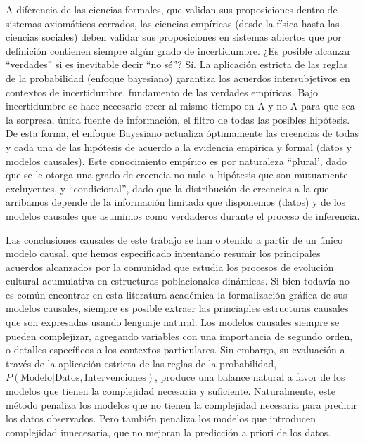 \documentclass[a4paper,11pt]{book}
\theoremstyle{definition}
\begin{document}
A diferencia de las ciencias formales, que validan sus proposiciones dentro de sistemas axiomáticos cerrados, las ciencias empíricas (desde la física hasta las ciencias sociales) deben validar sus proposiciones en sistemas abiertos que por definición contienen siempre algún grado de incertidumbre.
%
¿Es posible alcanzar ``verdades'' si es inevitable decir ``no sé''? Sí.
%
La aplicación estricta de las reglas de la probabilidad (enfoque bayesiano) garantiza los acuerdos intersubjetivos en contextos de incertidumbre, fundamento de las verdades empíricas.
%
 Bajo incertidumbre se hace necesario creer al mismo tiempo en A y no A para que sea la sorpresa, única fuente de información, el filtro de todas las posibles hipótesis.
%
De esta forma, el enfoque Bayesiano actualiza óptimamente las creencias de todas y cada una de las hipótesis de acuerdo a la evidencia empírica y formal (datos y modelos causales).
%
Este conocimiento empírico es por naturaleza ``plural', dado que se le otorga una grado de creencia no nulo a hipótesis que son mutuamente excluyentes, y ``condicional'', dado que la distribución de creencias a la que arribamos depende de la información limitada que disponemos (datos) y de los modelos causales que asumimos como verdaderos durante el proceso de inferencia.

Las conclusiones causales de este trabajo se han obtenido a partir de un único modelo causal, que hemos especificado intentando resumir los principales acuerdos alcanzados por la comunidad que estudia los procesos de evolución cultural acumulativa en estructuras poblacionales dinámicas.
%
Si bien todavía no es común encontrar en esta literatura académica la formalización gráfica de sus modelos causales, siempre es posible extraer las princiaples estructuras causales que son expresadas usando lenguaje natural.
%
Los modelos causales siempre se pueden complejizar, agregando variables con una importancia de segundo orden, o detalles específicos a los contextos particulares.
%
Sin embargo, su evaluación a través de la aplicación estricta de las reglas de la probabilidad, $P(\text{Modelo}|\text{Datos},\text{Intervenciones})$, produce una balance natural a favor de los modelos que tienen la complejidad necesaria y suficiente.
%
Naturalmente, este método penaliza los modelos que no tienen la complejidad necesaria para predicir los datos observados.
%
Pero también penaliza los modelos que introducen complejidad innecesaria, que no mejoran la predicción a priori de los datos.
\end{document}
